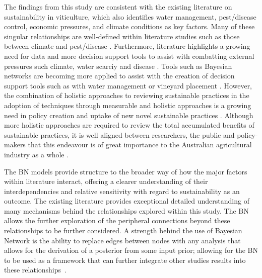 \documentclass[fleqn,10pt]{wlscirep}
\begin{document}
The findings from this study are consistent with the existing literature on sustainability in viticulture, which also identifies water management, pest/disease control, economic pressures, and climate conditions as key factors. Many of these singular relationships are well-defined within literature studies such as those between climate and pest/disease . Furthermore, literature  highlights a growing need for data and more decision support tools to assist with combatting external pressures such climate, water scarciy and disease . Tools such as Bayesian networks are becoming more applied to assist with the creation of decision support tools such as with water management  or vineyard placement . However, the combination of holistic approaches to reviewing sustainable practices in the adoption of techniques through measurable and holistic approaches is a growing need in policy creation and uptake of new novel sustainable practices . Although more holistic approaches are required to review the total accumulated benefits of sustainable practices, it is well aligned between researchers, the public and policy-makers that this endeavour is of great importance to the Australian agricultural industry as a whole .

The BN models provide structure to the broader way of how the major factors within literature interact, offering a clearer understanding of their interdependencies and relative sensitivity with regard to sustainability as an outcome. The existing literature provides exceptional detailed understanding of many mechanisms behind the relationships explored within this study. The BN allows the further exploration of the peripheral connections beyond these relationships to be further considered. A strength behind the use of Bayesian Network is the ability to replace edges between nodes with any analysis that allows for the derivation of a posterior from some input prior; allowing for the BN to be used as a framework that can further integrate other studies results into these relationships~.
\end{document}
